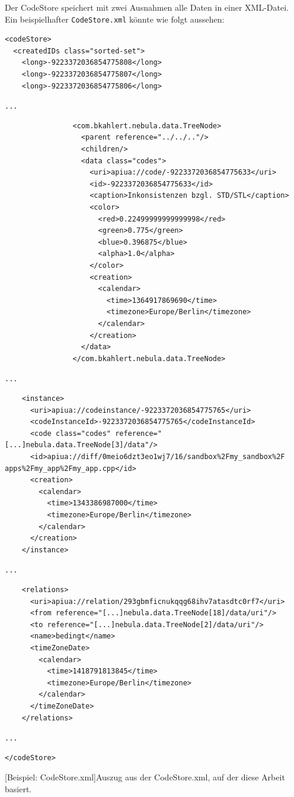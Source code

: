Der CodeStore speichert mit zwei Ausnahmen alle Daten in einer XML-Datei. Ein beispielhafter \texttt{CodeStore.xml} könnte wie folgt aussehen:

\begin{center}
\begin{verbatim}
<codeStore>
  <createdIDs class="sorted-set">
    <long>-9223372036854775808</long>
    <long>-9223372036854775807</long>
    <long>-9223372036854775806</long>
\end{verbatim}
\texttt{...}
\begin{verbatim}
                <com.bkahlert.nebula.data.TreeNode>
                  <parent reference="../../.."/>
                  <children/>
                  <data class="codes">
                    <uri>apiua://code/-9223372036854775633</uri>
                    <id>-9223372036854775633</id>
                    <caption>Inkonsistenzen bzgl. STD/STL</caption>
                    <color>
                      <red>0.22499999999999998</red>
                      <green>0.775</green>
                      <blue>0.396875</blue>
                      <alpha>1.0</alpha>
                    </color>
                    <creation>
                      <calendar>
                        <time>1364917869690</time>
                        <timezone>Europe/Berlin</timezone>
                      </calendar>
                    </creation>
                  </data>
                </com.bkahlert.nebula.data.TreeNode>
\end{verbatim}
\texttt{...}
\begin{verbatim}
    <instance>
      <uri>apiua://codeinstance/-9223372036854775765</uri>
      <codeInstanceId>-9223372036854775765</codeInstanceId>
      <code class="codes" reference="[...]nebula.data.TreeNode[3]/data"/>
      <id>apiua://diff/0meio6dzt3eo1wj7/16/sandbox%2Fmy_sandbox%2F apps%2Fmy_app%2Fmy_app.cpp</id>
      <creation>
        <calendar>
          <time>1343386987000</time>
          <timezone>Europe/Berlin</timezone>
        </calendar>
      </creation>
    </instance>
\end{verbatim}
\texttt{...}
\begin{verbatim}
    <relations>
      <uri>apiua://relation/293gbmficnukqqg68ihv7atasdtc0rf7</uri>
      <from reference="[...]nebula.data.TreeNode[18]/data/uri"/>
      <to reference="[...]nebula.data.TreeNode[2]/data/uri"/>
      <name>bedingt</name>
      <timeZoneDate>
        <calendar>
          <time>1418791813845</time>
          <timezone>Europe/Berlin</timezone>
        </calendar>
      </timeZoneDate>
    </relations>
\end{verbatim}
\texttt{...}
\begin{verbatim}
</codeStore>
\end{verbatim}
[Beispiel: CodeStore.xml]{Auszug aus der CodeStore.xml, auf der diese Arbeit basiert.}
\label{lst:codestore-file}
\end{center}

